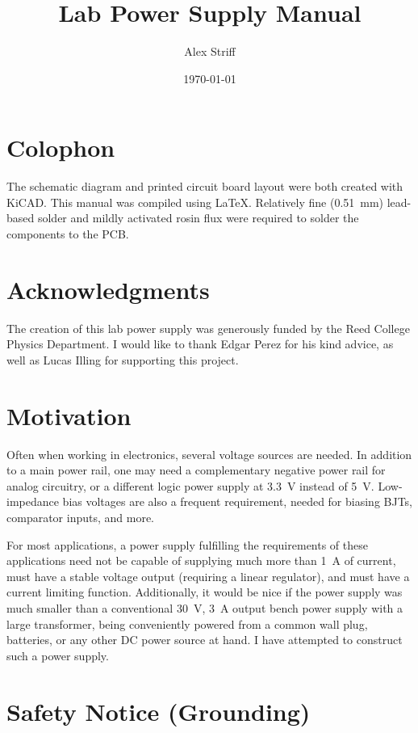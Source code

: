 \documentclass[letterpaper,twocolumn,11pt]{article}
\title{Lab Power Supply Manual}
\author{Alex Striff}
\date{\today}
\begin{document}
\maketitle
\tableofcontents
\listoftables
\thispagestyle{empty}

\section*{Colophon}

The schematic diagram and printed circuit board layout were both created with
KiCAD. This manual was compiled using \LaTeX. Relatively fine (\SI{0.51}{\mm})
lead-based solder and mildly activated rosin flux were required to solder the
components to the PCB.

\section{Acknowledgments}

The creation of this lab power supply was generously funded by the Reed College
Physics Department. I would like to thank Edgar Perez for his kind advice, as
well as Lucas Illing for supporting this project.

\section{Motivation}

Often when working in electronics, several voltage sources are needed. In
addition to a main power rail, one may need a complementary negative power rail
for analog circuitry, or a different logic power supply at \SI{3.3}{\V} instead
of \SI{5}{\V}. Low-impedance bias voltages are also a frequent requirement,
needed for biasing BJTs, comparator inputs, and more.

For most applications, a power supply fulfilling the requirements of these
applications need not be capable of supplying much more than \SI{1}{\A} of
current, must have a stable voltage output (requiring a linear regulator), and
must have a current limiting function.  Additionally, it would be nice if the
power supply was much smaller than a conventional \SI{30}{\V}, \SI{3}{\A} output
bench power supply with a large transformer, being conveniently powered from a
common wall plug, batteries, or any other DC power source at hand. I have
attempted to construct such a power supply.

\section{Safety Notice (Grounding)}
\end{document}
